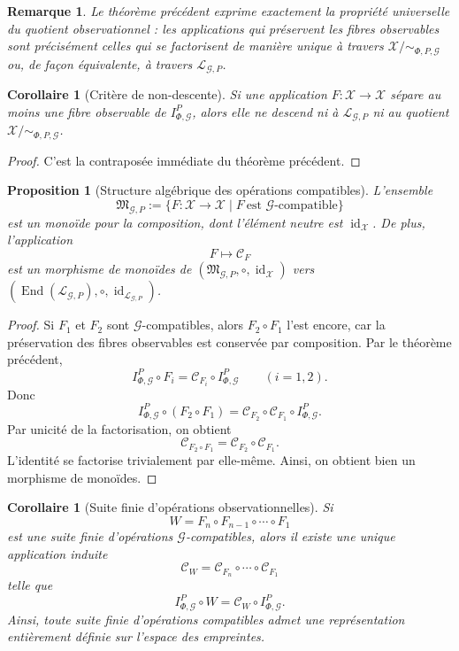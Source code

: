 \documentclass[11pt,a4paper,openany]{book}
\newtheorem{proposition}[definition]{Proposition}
\newtheorem{corollary}[definition]{Corollaire}
\newtheorem{remark}[definition]{Remarque}
\begin{document}
\begin{remark}
Le théorème précédent exprime exactement la propriété universelle du quotient observationnel : les applications qui préservent les fibres observables sont précisément celles qui se factorisent de manière unique à travers \(\mathcal X/{\sim_{\Phi,P,\mathcal G}}\) ou, de façon équivalente, à travers \(\mathcal L_{\mathcal G,P}\).
\end{remark}

\begin{corollary}[Critère de non-descente]
Si une application \(F:\mathcal X\to\mathcal X\) sépare au moins une fibre observable de \(I_{\Phi,\mathcal G}^P\), alors elle ne descend ni à \(\mathcal L_{\mathcal G,P}\) ni au quotient \(\mathcal X/{\sim_{\Phi,P,\mathcal G}}\).
\end{corollary}

\begin{proof}
C'est la contraposée immédiate du théorème précédent.
\end{proof}

\begin{proposition}[Structure algébrique des opérations compatibles]
\label{prop:monoid-operations}
L'ensemble
\[
\mathfrak M_{\mathcal G,P}:=\{F:\mathcal X\to\mathcal X\mid F\ \text{est \(\mathcal G\)-compatible}\}
\]
est un monoïde pour la composition, dont l'élément neutre est \(\operatorname{id}_{\mathcal X}\).
De plus, l'application
\[
F\longmapsto \mathcal C_F
\]
est un morphisme de monoïdes de \((\mathfrak M_{\mathcal G,P},\circ,\operatorname{id}_{\mathcal X})\) vers \((\operatorname{End}(\mathcal L_{\mathcal G,P}),\circ,\operatorname{id}_{\mathcal L_{\mathcal G,P}})\).
\end{proposition}

\begin{proof}
Si \(F_1\) et \(F_2\) sont \(\mathcal G\)-compatibles, alors \(F_2\circ F_1\) l'est encore, car la préservation des fibres observables est conservée par composition. Par le théorème précédent,
\[
I_{\Phi,\mathcal G}^P\circ F_i=\mathcal C_{F_i}\circ I_{\Phi,\mathcal G}^P
\qquad (i=1,2).
\]
Donc
\[
I_{\Phi,\mathcal G}^P\circ(F_2\circ F_1)
=
\mathcal C_{F_2}\circ\mathcal C_{F_1}\circ I_{\Phi,\mathcal G}^P.
\]
Par unicité de la factorisation, on obtient
\[
\mathcal C_{F_2\circ F_1}=\mathcal C_{F_2}\circ \mathcal C_{F_1}.
\]
L'identité se factorise trivialement par elle-même. Ainsi, on obtient bien un morphisme de monoïdes.
\end{proof}

\begin{corollary}[Suite finie d'opérations observationnelles]
Si
\[
W=F_n\circ F_{n-1}\circ\cdots\circ F_1
\]
est une suite finie d'opérations \(\mathcal G\)-compatibles, alors il existe une unique application induite
\[
\mathcal C_W=\mathcal C_{F_n}\circ\cdots\circ\mathcal C_{F_1}
\]
telle que
\[
I_{\Phi,\mathcal G}^P\circ W=\mathcal C_W\circ I_{\Phi,\mathcal G}^P.
\]
Ainsi, toute suite finie d'opérations compatibles admet une représentation entièrement définie sur l'espace des empreintes.
\end{corollary}
\end{document}
